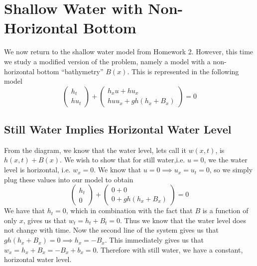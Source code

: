 \section{Shallow Water with Non-Horizontal Bottom}
We now return to the shallow water model from Homework 2. However, this time we study a modified version of the problem, namely a model with a non-horizontal bottom “bathymetry” $B(x)$. This is represented in the following model 
$$\begin{pmatrix}
h_t \\ hu_t
\end{pmatrix}+\begin{pmatrix}
h_x u+hu_x \\ huu_x + gh(h_x+B_x)
\end{pmatrix} = 0 $$
\subsection{Still Water Implies Horizontal Water Level}
From the diagram, we know that the water level, lets call it $w(x,t)$, is $h(x,t) + B(x)$. We wish to show that for still water,i.e. $u=0$, we the water level is horizontal, i.e. $w_x=0$. We know that $u=0 \implies u_x = u_t= 0$, so we simply plug these values into our model to obtain
$$\begin{pmatrix}
h_t \\ 0
\end{pmatrix}+\begin{pmatrix}
0+0 \\ 0 + gh(h_x+B_x)
\end{pmatrix} = 0 $$
We have that $h_t=0$, which in combination with the fact that $B$ is a function of only $x$, gives us that $w_t=h_t+B_t= 0$. Thus we know that the water level does not change with time. Now the second line of the system gives us that $gh(h_x+B_x)=0\implies h_x = -B_x$. This immediately gives us that $w_x=h_x+B_x=-B_x+b_x=0$. Therefore with still water, we have a constant, horizontal water level.  
